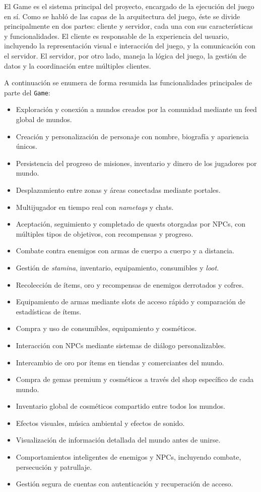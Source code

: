 El Game es el sistema principal del proyecto, encargado de la ejecución del juego en sí. 
Como se habló de las capas de la arquitectura del juego, éste se divide principalmente en dos partes: 
cliente y servidor, cada una con sus características y funcionalidades. El cliente es responsable de la 
experiencia del usuario, incluyendo la representación visual e interacción del juego, y la comunicación con el 
servidor. El servidor, por otro lado, maneja la lógica del juego, la gestión de datos y la coordinación 
entre múltiples clientes.

\vspace{0.25cm}

A continuación se enumera de forma resumida las funcionalidades principales de parte del \texttt{Game}:

\begin{itemize}
  \item Exploración y conexión a mundos creados por la comunidad mediante un feed global de mundos.
  \item Creación y personalización de personaje con nombre, biografía y apariencia únicos.
  \item Persistencia del progreso de misiones, inventario y dinero de los jugadores por mundo.
  \item Desplazamiento entre zonas y áreas conectadas mediante portales.
  \item Multijugador en tiempo real con \textit{nametags} y chats.
  \item Aceptación, seguimiento y completado de quests otorgadas por NPCs, con múltiples tipos de objetivos, con recompensas y progreso.
  \item Combate contra enemigos con armas de cuerpo a cuerpo y a distancia.
  \item Gestión de \textit{stamina}, inventario, equipamiento, consumibles y \textit{loot}.
  \item Recolección de ítems, oro y recompensas de enemigos derrotados y cofres.
  \item Equipamiento de armas mediante slots de acceso rápido y comparación de estadísticas de ítems.
  \item Compra y uso de consumibles, equipamiento y cosméticos.
  \item Interacción con NPCs mediante sistemas de diálogo personalizables.
  \item Intercambio de oro por ítems en tiendas y comerciantes del mundo.
  \item Compra de gemas premium y cosméticos a través del shop específico de cada mundo.
  \item Inventario global de cosméticos compartido entre todos los mundos.
  \item Efectos visuales, música ambiental y efectos de sonido.
  \item Visualización de información detallada del mundo antes de unirse.
  \item Comportamientos inteligentes de enemigos y NPCs, incluyendo combate, persecución y patrullaje.
  \item Gestión segura de cuentas con autenticación y recuperación de acceso.
\end{itemize}
